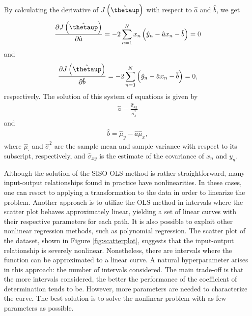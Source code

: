 \documentclass[english]{sobraep}
\begin{document}
By calculating the derivative of \(J\left( \hat{\boldsymbol{\thetaup}} \right)\) with respect to \(\hat{a}\) and \(\hat{b}\), we get
\begin{align}
    \frac{\partial J\left( \hat{\boldsymbol{\thetaup}} \right)}{\partial \hat{a}} = -2 \sum_{n=1}^{N} x_n\left( \hat{y}_n - \hat{a}x_n - \hat{b} \right) = 0
\end{align}
and
\begin{align}
    \frac{\partial J\left( \hat{\boldsymbol{\thetaup}} \right)}{\partial \hat{b}} = -2 \sum_{n=1}^{N} \left( \hat{y}_n - \hat{a}x_n - \hat{b} \right) = 0,
\end{align}
respectively. The solution of this system of equations is given by
\begin{align}
    \hat{a} = \frac{\hat{\sigma}_{xy}}{\hat{\sigma}^2_x}
\end{align}
and
\begin{align}
\hat{b} = \hat{\mu}_y - \hat{a}\hat{\mu}_x,
\end{align}
where \(\hat{\mu}_{\cdot}\) and \(\hat{\sigma}_{\cdot}^2\) are the sample mean and sample variance with respect to its subscript, respectively, and \(\hat{\sigma}_{xy}\) is the estimate of the covariance of \(x_n\) and \(y_n\).

Although the solution of the SISO OLS method is rather straightforward, many input-output relationships found in practice have nonlinearities. In these cases, one can resort to applying a transformation to the data in order to linearize the problem. Another approach is to utilize the OLS method in intervals where the scatter plot behaves approximately linear, yielding a set of linear curves with their respective parameters for each path. It is also possible to exploit other nonlinear regression methods, such as polynomial regression. The scatter plot of the dataset, shown in Figure \ref{fig:scatterplot}, suggests that the input-output relationship is severely nonlinear. Nonetheless, there are intervals where the function can be approximated to a linear curve. A natural hyperparameter arises in this approach: the number of intervals considered. The main trade-off is that the more intervals considered, the better the performance of the coefficient of determination tends to be. However, more parameters are needed to characterize the curve. The best solution is to solve the nonlinear problem with as few parameters as possible.
\end{document}
